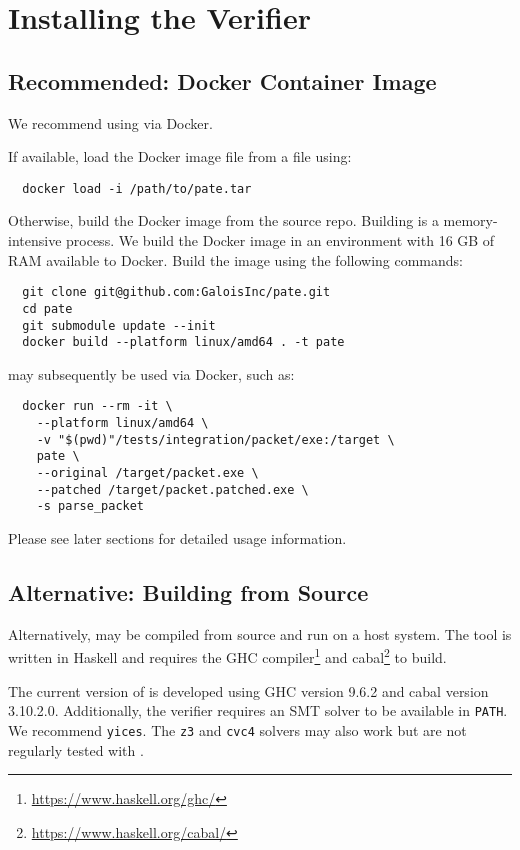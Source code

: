 \section{Installing the \pate{} Verifier}
\label{sec:build-pate-verif}

\subsection{Recommended: Docker Container Image}

We recommend using \pate{} via Docker.

If available, load the Docker image file from a file using:
\begin{verbatim}
  docker load -i /path/to/pate.tar
\end{verbatim}

Otherwise, build the Docker image from the \pate{} source repo.
Building \pate{} is a memory-intensive process.
We build the Docker image in an environment with 16 GB of RAM available to Docker.
Build the image using the following commands:

\begin{verbatim}
  git clone git@github.com:GaloisInc/pate.git
  cd pate
  git submodule update --init
  docker build --platform linux/amd64 . -t pate
\end{verbatim}

\pate{} may subsequently be used via Docker, such as:

\begin{verbatim}
  docker run --rm -it \
    --platform linux/amd64 \
    -v "$(pwd)"/tests/integration/packet/exe:/target \
    pate \
    --original /target/packet.exe \
    --patched /target/packet.patched.exe \
    -s parse_packet
\end{verbatim}

Please see later sections for detailed usage information.

\subsection{Alternative: Building from Source}

Alternatively, \pate{} may be compiled from source and run on a host system.
The \pate{} tool is written in Haskell and requires the GHC compiler\footnote{\url{https://www.haskell.org/ghc/}} and cabal\footnote{\url{https://www.haskell.org/cabal/}} to build.

The current version of \pate{} is developed using GHC version 9.6.2 and cabal version 3.10.2.0.
Additionally, the verifier requires an SMT solver to be available in \texttt{PATH}.
We recommend \texttt{yices}.
The \texttt{z3} and \texttt{cvc4} solvers may also work but are not regularly tested with \pate{}.

